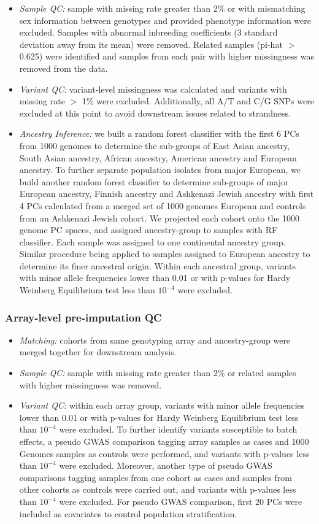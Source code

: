 \documentclass[12pt]{amsart}
\begin{document}
\begin{itemize}
\item \emph{Sample QC:} sample with missing rate greater than 2\% or with mismatching sex information between genotypes and provided phenotype information were excluded. Samples with abnormal inbreeding coefficients (3 standard deviation away from its mean) were removed. Related samples (pi-hat $>$ 0.625) were identified and samples from each pair with higher missingness was removed from the data. 
\item \emph{Variant QC:} variant-level missingness was calculated and variants with missing rate $>$ 1\% were excluded. Additionally, all A/T and C/G SNPs were excluded at this point to avoid downstream issues related to strandness. 
\item \emph{Ancestry Inference:}  we built a random forest classifier with the first 6 PCs from 1000 genomes to determine the sub-groups of East Asian ancestry, South Asian ancestry, African ancestry, American ancestry and European ancestry. To further separate population isolates from major European, we build another random forest classifier to determine sub-groups of major European ancestry, Finnish ancestry and Ashkenazi Jewish ancestry with first 4 PCs calculated from a merged set of 1000 genomes European and controls from an Ashkenazi Jewish cohort. We projected each cohort onto the 1000 genome PC spaces, and assigned ancestry-group to samples with RF classifier.  Each sample was assigned to one continental ancestry group. Similar procedure being applied to samples assigned to European ancestry to determine its finer ancestral origin. Within each ancestral group, variants with minor allele frequencies lower than 0.01 or with p-values for Hardy Weinberg Equilibrium test less than $10^{-4}$ were excluded.
\end{itemize}

\subsubsection{Array-level pre-imputation QC}
\begin{itemize}
\item \emph{Matching:} cohorts from same genotyping array and ancestry-group were merged together for downstream analysis.
\item \emph{Sample QC:} sample with missing rate greater than 2\% or related samples with higher missingness was removed.
\item \emph{Variant QC:} within each array group, variants with minor allele frequencies lower than 0.01 or with p-values for Hardy Weinberg Equilibrium test less than $10^{-4}$ were excluded. To further identify variants susceptible to batch effects, a pseudo GWAS comparison tagging array samples as cases and 1000 Genomes samples as controls were performed,  and variants with p-values less than $10^{-4}$ were excluded. Moreover, another type of pseudo GWAS comparisons tagging samples from one cohort as cases and samples from other cohorts as controls were carried out, and variants with p-values less than $10^{-4}$ were excluded. For pseudo GWAS comparison, first 20 PCs were included as covariates to control population stratification.
\end{itemize}
\end{document}
